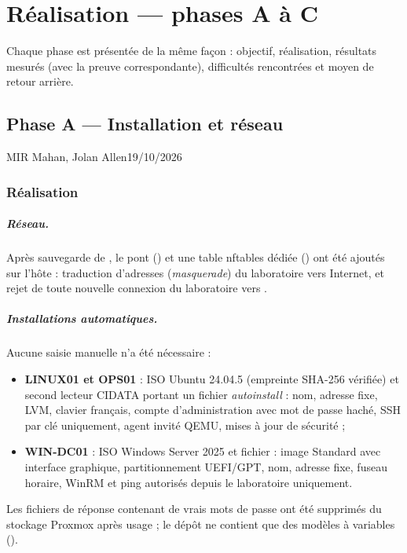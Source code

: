 \chapter{Réalisation — phases A à C}\label{chap:phases-ac}

Chaque phase est présentée de la même façon : objectif, réalisation, résultats mesurés (avec la
preuve correspondante), difficultés rencontrées et moyen de retour arrière.

\section{Phase A — Installation et réseau}\label{sec:phase-a}

      {MIR Mahan, Jolan Allen}{19/10/2026}{\fait}

\subsection{Réalisation}

\paragraph{Réseau.} Après sauvegarde de , le pont 
() et une table nftables dédiée
() ont été ajoutés sur l'hôte : traduction d'adresses
(\emph{masquerade}) du laboratoire vers Internet, et rejet de toute nouvelle connexion du
laboratoire vers .

\paragraph{Installations automatiques.} Aucune saisie manuelle n'a été nécessaire :
\begin{itemize}
  \item \textbf{LINUX01 et OPS01} : ISO Ubuntu 24.04.5 (empreinte SHA-256 vérifiée) et second lecteur
        \og CIDATA \fg{} portant un fichier \emph{autoinstall} : nom, adresse fixe, LVM, clavier
        français, compte d'administration avec mot de passe haché, SSH par clé uniquement, agent
        invité QEMU, mises à jour de sécurité ;
  \item \textbf{WIN-DC01} : ISO Windows Server 2025 et fichier  : image Standard
        avec interface graphique, partitionnement UEFI/GPT, nom, adresse fixe, fuseau horaire, WinRM
        et ping autorisés depuis le laboratoire uniquement.
\end{itemize}
Les fichiers de réponse contenant de vrais mots de passe ont été supprimés du stockage Proxmox
après usage ; le dépôt ne contient que des modèles à variables ().

